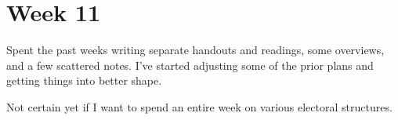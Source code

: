 \section{Week 11}

Spent the past weeks writing separate handouts and readings, some overviews, and a few scattered notes.  I've started adjusting some of the prior plans and getting things into better shape.

Not certain yet if I want to spend an entire week on various electoral structures.